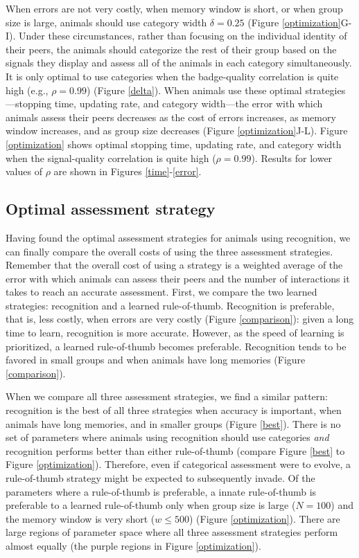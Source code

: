 When errors are not very costly, when memory window is short, or when group size is large, animals should use category width $\delta=0.25$ (Figure \ref{optimization}G-I). Under these circumstances, rather than focusing on the individual identity of their peers, the animals should categorize the rest of their group based on the signals they display and assess all of the animals in each category simultaneously. It is only optimal to use categories when the badge-quality correlation is quite high (e.g., $\rho=0.99$) (Figure \ref{delta}). When animals use these optimal strategies---stopping time, updating rate, and category width---the error with which animals assess their peers decreases as the cost of errors increases, as memory window increases, and as group size decreases (Figure \ref{optimization}J-L). Figure \ref{optimization} shows optimal stopping time, updating rate, and category width when the signal-quality correlation is quite high ($\rho=0.99$). Results for lower values of $\rho$ are shown in Figures \ref{time}-\ref{error}.

\subsection*{Optimal assessment strategy}
Having found the optimal assessment strategies for animals using recognition, we can finally compare the overall costs of using the three assessment strategies. Remember that the overall cost of using a strategy is a weighted average of the error with which animals can assess their peers and the number of interactions it takes to reach an accurate assessment. First, we compare the two learned strategies: recognition and a learned rule-of-thumb. Recognition is preferable, that is, less costly, when errors are very costly (Figure \ref{comparison}): given a long time to learn, recognition is more accurate. However, as the speed of learning is prioritized, a learned rule-of-thumb becomes preferable. Recognition tends to be favored in small groups and when animals have long memories (Figure \ref{comparison}).

When we compare all three assessment strategies, we find a similar pattern: recognition is the best of all three strategies when accuracy is important, when animals have long memories, and in smaller groups (Figure \ref{best}). There is no set of parameters where animals using recognition should use categories \emph{and} recognition performs better than either rule-of-thumb (compare Figure \ref{best} to Figure \ref{optimization}). Therefore, even if categorical assessment were to evolve, a rule-of-thumb strategy might be expected to subsequently invade. Of the parameters where a rule-of-thumb is preferable, a innate rule-of-thumb is preferable to a learned rule-of-thumb only when group size is large ($N=100$) and the memory window is very short ($w\leq500$) (Figure \ref{optimization}). There are large regions of parameter space where all three assessment strategies perform almost equally (the purple regions in Figure \ref{optimization}).

